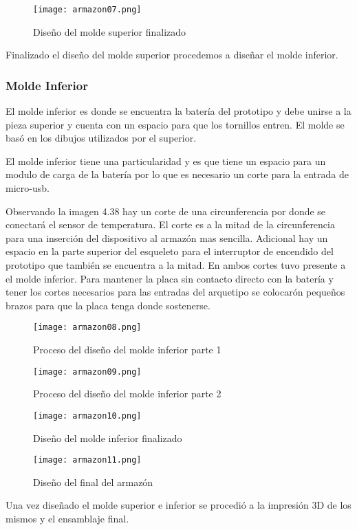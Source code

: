 \begin{figure}[H]
	\centering
	\texttt{[image: armazon07.png]}
	\caption{Diseño del molde superior finalizado}
\end{figure}

\par \noindent
Finalizado el diseño del molde superior procedemos a diseñar el molde inferior.

\subsubsection{Molde Inferior}

\par \noindent
El molde inferior es donde se encuentra la batería del prototipo y debe unirse a la pieza superior y cuenta con un espacio para que los tornillos entren. El molde se basó en los dibujos utilizados por el superior. 

\par \noindent
El molde inferior tiene una particularidad y es que tiene un espacio para un modulo de carga de la batería por lo que es necesario un corte para la entrada de micro-usb. 

\par \noindent
Observando la imagen 4.38 hay un corte de una circunferencia por donde se conectará el sensor de temperatura. El corte es a la mitad de la circunferencia para una inserción del dispositivo al armazón mas sencilla. Adicional hay un espacio en la parte superior del esqueleto para el interruptor de encendido del prototipo que también se encuentra a la mitad. En ambos cortes tuvo presente a el molde inferior. Para mantener la placa sin contacto directo con la batería y tener los cortes necesarios para las entradas del arquetipo se colocarón pequeños brazos para que la placa tenga donde sostenerse.

\begin{figure}[H]
	\centering
	\texttt{[image: armazon08.png]}
	\caption{Proceso del diseño del molde inferior parte 1}
\end{figure}

\begin{figure}[H]
	\centering
	\texttt{[image: armazon09.png]}
	\caption{Proceso del diseño del molde inferior parte 2}
\end{figure}

\begin{figure}[H]
	\centering
	\texttt{[image: armazon10.png]}
	\caption{Diseño del molde inferior finalizado}
\end{figure}

\begin{figure}[H]
	\centering
	\texttt{[image: armazon11.png]}
	\caption{Diseño del final del armazón}
\end{figure}

\par \noindent
Una vez diseñado el molde superior e inferior se procedió a la impresión 3D de los mismos y el ensamblaje final.

